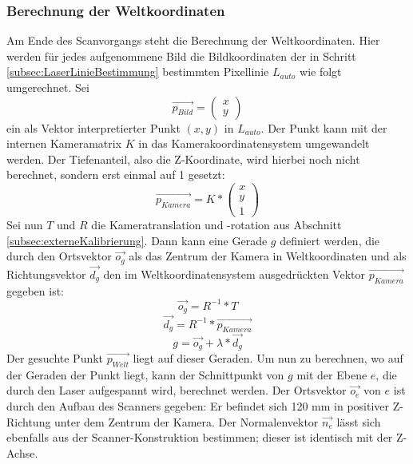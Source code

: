 \subsubsection{Berechnung der Weltkoordinaten}
Am Ende des Scanvorgangs steht die Berechnung der Weltkoordinaten. Hier werden für jedes aufgenommene Bild die Bildkoordinaten der in Schritt \ref{subsec:LaserLinieBestimmung} bestimmten Pixellinie \(L_{auto}\) wie folgt umgerechnet. Sei 
\begin{equation}
\vec{p_{Bild}} = \left(\begin{array}{c}x\\y\end{array}\right)
\end{equation} 
ein als Vektor interpretierter Punkt \((x, y)\) in \(L_{auto}\). Der Punkt kann mit der internen Kameramatrix \(K\) in das Kamerakoordinatensystem umgewandelt werden. Der Tiefenanteil, also die Z-Koordinate, wird hierbei noch nicht berechnet, sondern erst einmal auf 1 gesetzt:
\begin{equation}
\vec{p_{Kamera}}  = K * \left(\begin{array}{c}x\\y\\1\end{array}\right)
\end{equation}
Sei nun \(T\) und \(R\) die Kameratranslation und -rotation aus Abschnitt \ref{subsec:externeKalibrierung}. Dann kann eine Gerade \(g\) definiert werden, die durch den Ortsvektor \(\vec{o_{g}}\) als das Zentrum der Kamera in Weltkoordinaten und als Richtungsvektor \(\vec{d_{g}}\) den im Weltkoordinatensystem ausgedrückten Vektor \(\vec{p_{Kamera}}\) gegeben ist:
\begin{equation}
\vec{o_{g}} = R^{-1} * T
\end{equation}
\begin{equation}
\vec{d_{g}} = R^{-1} * \vec{p_{Kamera}}
\end{equation}
\begin{equation}
g = \vec{o_{g}} + \lambda * \vec{d_{g}}
\end{equation}
Der gesuchte Punkt \(\vec{p_{Welt}}\) liegt auf dieser Geraden. Um nun zu berechnen, wo auf der Geraden der Punkt liegt, kann der Schnittpunkt von \(g\) mit der Ebene \(e\), die durch den Laser aufgespannt wird, berechnet werden. Der Ortsvektor \(\vec{o_{e}}\) von \(e\) ist durch den Aufbau des Scanners gegeben: Er befindet sich 120 mm in positiver Z-Richtung unter dem Zentrum der Kamera. Der Normalenvektor \(\vec{n_{e}}\) lässt sich ebenfalls aus der Scanner-Konstruktion bestimmen; dieser ist identisch mit der Z-Achse.
